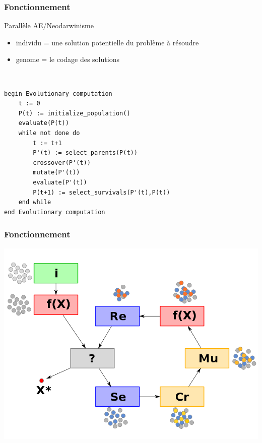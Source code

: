\documentclass{beamer}
\begin{document}
\begin{frame}[fragile]
\frametitle{Fonctionnement}
Parallèle AE/Neodarwinisme
\begin{itemize}
	\item individu = une solution potentielle du problème à résoudre
	\item genome = le codage des solutions 
\end{itemize}
~\\
\begin{lstlisting}[frame=single]
begin Evolutionary computation
    t := 0
    P(t) := initialize_population() 
    evaluate(P(t))
    while not done do
        t := t+1
        P'(t) := select_parents(P(t))
        crossover(P'(t))
        mutate(P'(t))
        evaluate(P'(t))
        P(t+1) := select_survivals(P'(t),P(t))
    end while
end Evolutionary computation
\end{lstlisting}
\end{frame}



\begin{frame}
\frametitle{Fonctionnement}
\begin{center}
        \includegraphics[width=.80\linewidth]{images/ae}
\end{center}
\end{frame}
\end{document}
